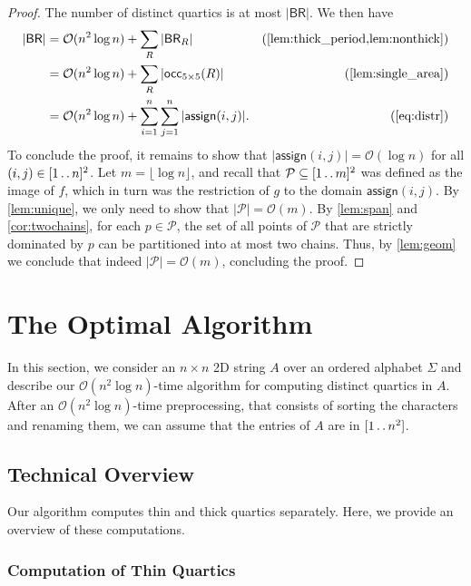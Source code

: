 \documentclass[11pt,letterpaper]{article}
\newcommand{\cO}{\mathcal{O}}
\newcommand{\BR}{\textsf{BR}}
\def\dd{\mathinner{.\,.}}
\newcommand{\OCR}{\textsf{occ}_{5\times 5}}
\newcommand{\assign}{\textsf{assign}}
\renewcommand{\P}{\mathcal{P}}
\begin{document}
\begin{proof}
The number of distinct quartics is at most $|\BR|$.
We then have
\begin{align*}
|\BR| & =\cO(n^2 \log n) + \sum_R |\BR_R| & \text{(\cref{lem:thick_period,lem:nonthick})} \\
    & = \cO(n^2 \log n) + \sum_R |\OCR(R)| & \text{(\cref{lem:single_area})} \\
    & = \cO(n^2 \log n) + \sum_{i=1}^{n}\sum_{j=1}^{n}|\assign(i,j)|. & \text{(\ref{eq:distr})}
\end{align*}
To conclude the proof, it remains to show that $|\assign(i,j)|=\cO(\log n)$ for all $(i,j)\in [1\dd n]^2$.
Let $m=\lfloor\log n\rfloor$, and
recall that $\P \subseteq [1 \dd m]^2$ was defined as the image of $f$, which in turn was the restriction of $g$ to
the domain $\assign(i,j)$.
By \cref{lem:unique}, we only need to show that $|\P|=\cO(m)$.
By \cref{lem:span} and \cref{cor:twochains}, for each $p\in \P$, the set of all points of $\P$
that are strictly dominated by $p$ can be partitioned into at most two chains.
Thus, by \cref{lem:geom} we conclude that indeed $|\P|=\cO(m)$, concluding the proof.
\end{proof}


\section{The Optimal Algorithm}
\label{sec:algo}

In this section, we consider an $n\times n$ 2D string $A$ over an ordered alphabet $\Sigma$ and describe our $\cO(n^2 \log n)$-time algorithm for computing distinct quartics in $A$.
After an $\cO(n^2 \log n)$-time preprocessing, that consists of sorting the characters and renaming them, we can assume that the entries of $A$ are in $[1 \dd n^{2}]$.

\subsection{Technical Overview}
\label{sec:over}
Our algorithm computes thin and thick quartics separately.
Here, we provide an overview of these computations.

\subsubsection*{Computation of Thin Quartics}
\end{document}

